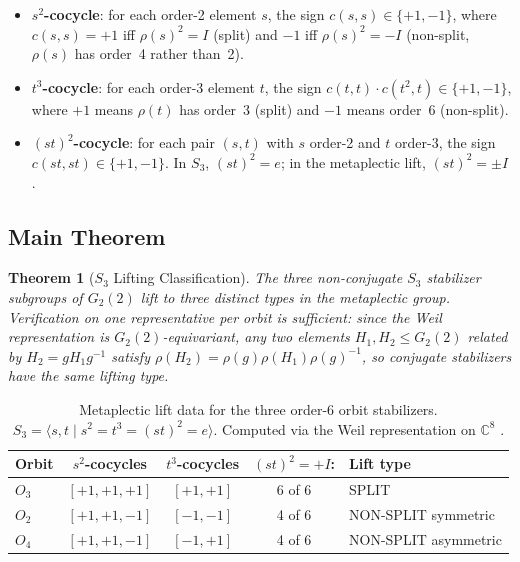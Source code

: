 \documentclass[11pt,a4paper]{article}
\newtheorem{theorem}{Theorem}[section]
\theoremstyle{remark}
\begin{document}
\begin{itemize}
  \item \textbf{$s^2$-cocycle}: for each order-2 element $s$,
        the sign $c(s,s) \in \{+1,-1\}$, where $c(s,s) = +1$ iff
        $\rho(s)^2 = I$ (split) and $-1$ iff $\rho(s)^2 = -I$ (non-split,
        $\rho(s)$ has order~4 rather than~2).

  \item \textbf{$t^3$-cocycle}: for each order-3 element $t$,
        the sign $c(t,t) \cdot c(t^2,t) \in \{+1,-1\}$, where $+1$ means
        $\rho(t)$ has order~3 (split) and $-1$ means order~6 (non-split).

  \item \textbf{$(st)^2$-cocycle}: for each pair $(s,t)$ with $s$ order-2
        and $t$ order-3, the sign $c(st, st) \in \{+1,-1\}$.
        In $S_3$, $(st)^2 = e$; in the metaplectic lift, $(st)^2 = \pm I$.
\end{itemize}

\subsection{Main Theorem}

\begin{theorem}[$S_3$ Lifting Classification]\label{thm:s3lift}
The three non-conjugate $S_3$ stabilizer subgroups of $G_2(2)$ lift to three
distinct types in the metaplectic group.
Verification on one representative per orbit is sufficient: since the Weil
representation is $G_2(2)$-equivariant, any two elements $H_1, H_2 \leq G_2(2)$
related by $H_2 = gH_1 g^{-1}$ satisfy $\rho(H_2) = \rho(g)\rho(H_1)\rho(g)^{-1}$,
so conjugate stabilizers have the same lifting type.
\end{theorem}

\begin{table}[H]
\centering
\caption{Metaplectic lift data for the three order-6 orbit stabilizers.
$S_3 = \langle s, t \mid s^2 = t^3 = (st)^2 = e\rangle$.
Computed via the Weil representation on $\mathbb{C}^8$
\cite{PaperXVsuppl}.}
\label{tab:s3lift}
\begin{tabular}{lcccl}
\toprule
Orbit & $s^2$-cocycles & $t^3$-cocycles & $(st)^2 = +I$: & Lift type \\
\midrule
$O_3$ & $[+1, +1, +1]$ & $[+1, +1]$ & 6 of 6 & SPLIT \\
$O_2$ & $[+1, +1, -1]$ & $[-1, -1]$ & 4 of 6 & NON-SPLIT symmetric \\
$O_4$ & $[+1, +1, -1]$ & $[-1, +1]$ & 4 of 6 & NON-SPLIT asymmetric \\
\bottomrule
\end{tabular}
\end{table}
\end{document}
